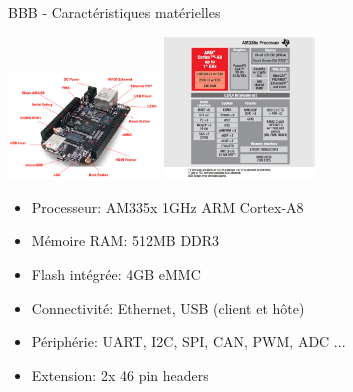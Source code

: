 \documentclass{beamer}
\begin{document}
\begin{frame}{BBB - Caract\'eristiques mat\'{e}rielles}
  \begin{center}
    \includegraphics[width=40mm]{./pic/bbb_overview.png}
    \hspace{10.00mm}
    \includegraphics[width=40mm]{./pic/arm335x_dia.jpg}
  \end{center}

  \begin{tiny}
    \begin{itemize}
    \item Processeur: AM335x 1GHz ARM Cortex-A8
    \item M\'emoire RAM: 512MB DDR3
    \item Flash int\'egr\'ee: 4GB eMMC
    \item Connectivit\'e: Ethernet, USB (client et h\^ote)
    \item P\'eriph\'erie: UART, I2C, SPI, CAN, PWM, ADC ...
    \item Extension: 2x 46 pin headers
    \end{itemize}
  \end{tiny}
\end{frame}
\end{document}
